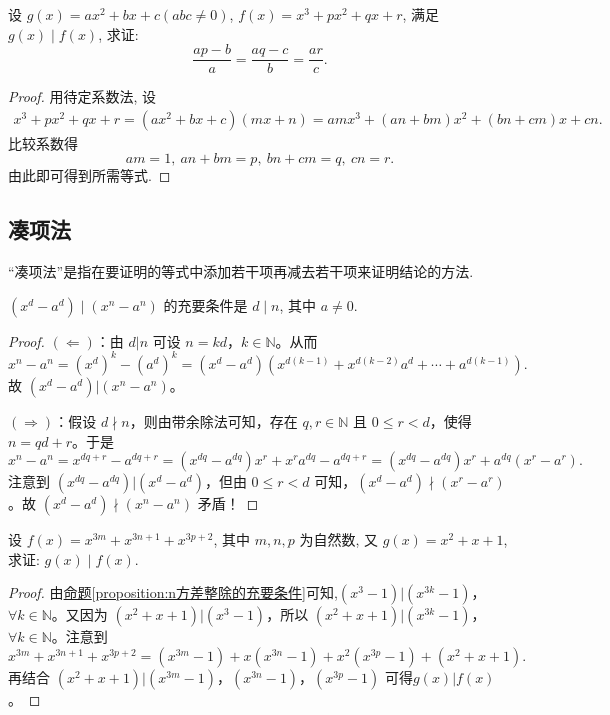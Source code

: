 \documentclass[../../main.tex]{subfiles}%
\begin{document}
\begin{example}
设 \(g(x)=ax^{2}+bx + c(abc\neq0)\), \(f(x)=x^{3}+px^{2}+qx + r\), 满足 \(g(x)\mid f(x)\), 求证:
\[
\frac{ap - b}{a}=\frac{aq - c}{b}=\frac{ar}{c}.
\]
\end{example}
\begin{proof}

用待定系数法, 设
\begin{align*}
x^{3}+px^{2}+qx + r=(ax^{2}+bx + c)(mx + n)
=amx^{3}+(an + bm)x^{2}+(bn + cm)x+cn.
\end{align*}
比较系数得
\[
am = 1,\ an + bm = p,\ bn + cm = q,\ cn = r.
\]
由此即可得到所需等式. 

\end{proof}

\subsection{凑项法}

“凑项法”是指在要证明的等式中添加若干项再减去若干项来证明结论的方法.

\begin{proposition}\label{proposition:n方差整除的充要条件}
\((x^{d}-a^{d}) \mid (x^{n}-a^{n})\) 的充要条件是 \(d\mid n\), 其中 \(a\neq0\).
\end{proposition}
\begin{proof}

$(\Leftarrow)$：由 \(d|n\) 可设 \(n = kd\)，\(k\in \mathbb{N}\)。从而
\[
x^n - a^n=(x^d)^k-(a^d)^k=(x^d - a^d)(x^{d(k - 1)}+x^{d(k - 2)}a^d+\cdots +a^{d(k - 1)}).
\]
故 \((x^d - a^d)|(x^n - a^n)\)。

\((\Rightarrow)\)：假设 \(d\nmid n\)，则由带余除法可知，存在 \(q, r\in \mathbb{N}\) 且 \(0\leqslant r < d\)，使得 \(n = qd + r\)。于是
\[
x^n - a^n=x^{dq + r}-a^{dq + r}=(x^{dq}-a^{dq})x^r+x^ra^{dq}-a^{dq + r}=(x^{dq}-a^{dq})x^r+a^{dq}(x^r - a^r).
\]
注意到 \((x^{dq}-a^{dq})|(x^d - a^d)\)，但由 \(0\leqslant r < d\) 可知，\((x^d - a^d)\nmid (x^r - a^r)\)。故 \((x^d - a^d)\nmid (x^n - a^n)\) 矛盾！

\end{proof}

\begin{example}
设 \(f(x)=x^{3m}+x^{3n + 1}+x^{3p+2}\), 其中 \(m,n,p\) 为自然数, 又 \(g(x)=x^{2}+x + 1\), 求证: \(g(x)\mid f(x)\).
\end{example}
\begin{proof}

由\hyperref[proposition:n方差整除的充要条件]{命题\ref{proposition:n方差整除的充要条件}}可知,\((x^3 - 1)|(x^{3k} - 1)\)，\(\forall k\in \mathbb{N}\)。又因为 \((x^2 + x + 1)|(x^3 - 1)\)，所以 \((x^2 + x + 1)|(x^{3k} - 1)\)，\(\forall k\in \mathbb{N}\)。注意到
\[
x^{3m}+x^{3n + 1}+x^{3p + 2}=(x^{3m}-1)+x(x^{3n}-1)+x^2(x^{3p}-1)+(x^2 + x + 1).
\]
再结合 \((x^2 + x + 1)|(x^{3m}-1)\)，\((x^{3n}-1)\)，\((x^{3p}-1)\) 可得\(g(x)|f(x)\)。

\end{proof}
\end{document}
